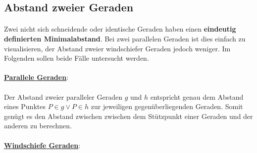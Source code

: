     \subsection{Abstand zweier Geraden}

        \paragraph{} Zwei nicht sich schneidende oder identische Geraden haben einen \textbf{eindeutig definierten Minimalabstand}. Bei zwei parallelen
        Geraden ist dies einfach zu visualisieren, der Abstand zweier windschiefer Geraden jedoch weniger. Im Folgenden sollen beide Fälle untersucht werden.
        \\
        \\
        \underline{\textbf{Parallele Geraden}}:
            \paragraph{} Der Abstand zweier paralleler Geraden $g$ und $h$ entspricht genau dem Abstand eines Punktes $P \in g \lor P\in h$ zur jeweiligen
            gegenüberliegenden Geraden. Somit genügt es den Abstand zwischen zwischen dem Stützpunkt einer Geraden und der anderen zu berechnen.
        \\
        \\
        \underline{\textbf{Windschiefe Geraden}}:
